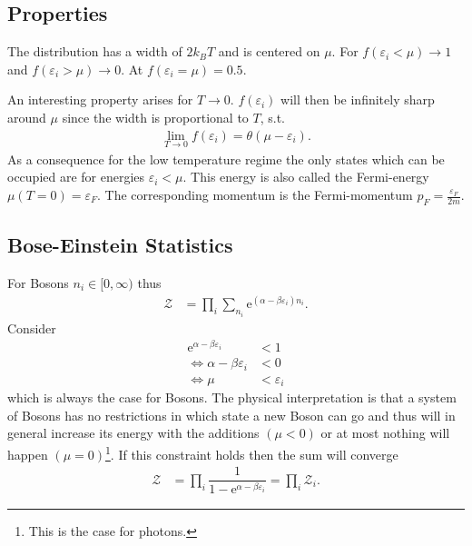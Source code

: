\documentclass[a4paper,10pt]{article}
\numberwithin{equation}{section}
\begin{document}
\begin{multicols}{2}
\subsection{Properties}
The distribution has a width of $2k_BT$ and is centered on $\mu $.
For $f(\varepsilon _i<\mu )\rightarrow 1$ and $f(\varepsilon _i>\mu )\rightarrow 0$.
At $f(\varepsilon _i=\mu )=0.5$.

An interesting property arises for $T\rightarrow 0$.
$f(\varepsilon _i)$ will then be infinitely sharp around $\mu $ since the width is proportional to $T$, s.t.\ 
\begin{align} 
  \lim_{T\rightarrow 0}f(\varepsilon _i)=\theta (\mu -\varepsilon _i)
.\end{align}
As a consequence for the low temperature regime the only states which can be occupied are for energies $\varepsilon _i<\mu $.
This energy is also called the Fermi-energy $\mu (T=0)=\varepsilon _F$.
The corresponding momentum is the Fermi-momentum $p_F=\tfrac{\varepsilon _F}{2m}$.

\subsection{Bose-Einstein Statistics}
For Bosons $n_i  \in [0,\infty)$ thus
\begin{align} 
  \mathcal{Z} &= \prod_{i}^{}\sum_{n_i}^{}\text{e}^{(\alpha -\beta \varepsilon _i)n_i}
.\end{align} 
Consider
\begin{align} 
  \text{e}^{\alpha -\beta \varepsilon _i}&<1\\
  \Leftrightarrow \alpha -\beta \varepsilon _i&<0\\
  \Leftrightarrow \mu &<\varepsilon _i
\end{align} 
which is always the case for Bosons.
The physical interpretation is that a system of Bosons has no restrictions in which state a new Boson can go and thus will in general increase its energy with the additions $(\mu <0)$ or at most nothing will happen $(\mu =0)$\footnote{This is the case for photons.}.
If this constraint holds then the sum will converge
\begin{align} 
  \mathcal{Z} &= \prod_{i}^{}\dfrac{1}{1-\text{e}^{\alpha -\beta \varepsilon _i}}=\prod_{i}^{}\mathcal{Z}_i
.\end{align} 


\end{multicols}
\end{document}
